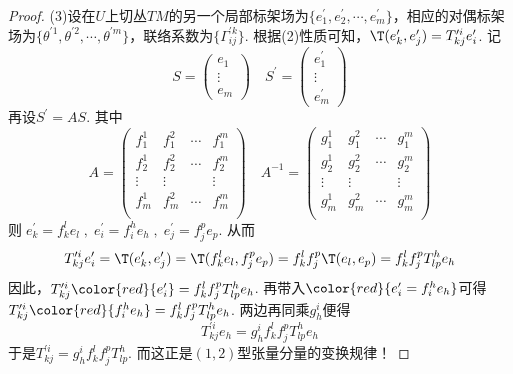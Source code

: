 \begin{proof}
	(3)\;设在$U$上切丛$TM$的另一个局部标架场为$\{e^{\prime}_{1},e^{\prime}_{2},\cdots,e^{\prime}_{m} \}$，相应的对偶标架场为$\{\theta^{\prime1},\theta^{\prime2},\cdots,\theta^{\prime m} \}$，联络系数为$\{\Gamma^{\prime k}_{ij}\}$. 根据(2)性质可知，$\T(e^{\prime}_{k},e^{\prime}_{j})=T^{\prime i}_{kj}e^{\prime}_{i}$. 记
	\[
	S=\left( \begin{array}{ccc}{e_{1}} \\ {\vdots}  \\ {e_{m}} \end{array}\right)\quad S^{\prime}=\left( \begin{array}{ccc}{e^{\prime}_{1}} \\ {\vdots}  \\ {e^{\prime}_{m}} \end{array}\right)
	\]
	再设$S^{\prime}=AS$. 其中
	\[
	A=\left( \begin{array}{cccc}{f_{1}^{1}} & {f_{1}^{2}}&{\cdots}&{f_{1}^{m}}\\ {f_{2}^{1}} & {f_{2}^{2}}&{\cdots}&{f_{2}^{m}}\\ {\vdots} & {\vdots}&{ }&{\vdots}\\{f_{m}^{1}} & {f_{m}^{2}}&{\cdots}&{f_{m}^{m}}\\ \end{array}\right)\quad A^{-1}=\left( \begin{array}{cccc}{g_{1}^{1}} & {g_{1}^{2}}&{\cdots}&{g_{1}^{m}}\\ {g_{2}^{1}} & {g_{2}^{2}}&{\cdots}&{g_{2}^{m}}\\ {\vdots} & {\vdots}&{ }&{\vdots}\\{g_{m}^{1}} & {g_{m}^{2}}&{\cdots}&{g_{m}^{m}}\\ \end{array}\right)
	\]
	则$\;e^{\prime}_{k}=f^{l}_{k}e_{l}\;,\;e^{\prime}_{i}=f^{h}_{i}e_{h}\;,\;e^{\prime}_{j}=f^{p}_{j}e_{p}$. 从而
	\[
	T^{\prime i}_{kj}e^{\prime}_{i}=\T(e^{\prime}_{k},e^{\prime}_{j})
	=\T(f^{l}_{k}e_{l},f^{p}_{j}e_{p}) =f^{l}_{k}f^{p}_{j}\T(e_{l},e_{p})=f^{l}_{k}f^{p}_{j}T^{h}_{lp}e_{h}
	\]
	因此，$T^{\prime i}_{kj}{\color{red}{e^{\prime}_{i}}}=f^{l}_{k}f^{p}_{j}T^{h}_{lp}e_{h}$. 再带入${\color{red}{e^{\prime}_{i}=f^{h}_{i}e_{h}}}$可得
	$T^{\prime i}_{kj}{\color{red}{f^{h}_{i}e_{h}}}=f^{l}_{k}f^{p}_{j}T^{h}_{lp}e_{h}$. 两边再同乘$g_{h}^{i}$便得
	\[
	T^{\prime i}_{kj}e_{h}=g_{h}^{i}f^{l}_{k}f^{p}_{j}T^{h}_{lp}e_{h}
	\]
	于是$T^{\prime i}_{kj} =g_{h}^{i}f^{l}_{k}f^{p}_{j}T^{h}_{lp}$. 而这正是$(1,2)$型张量分量的变换规律！
\end{proof}

